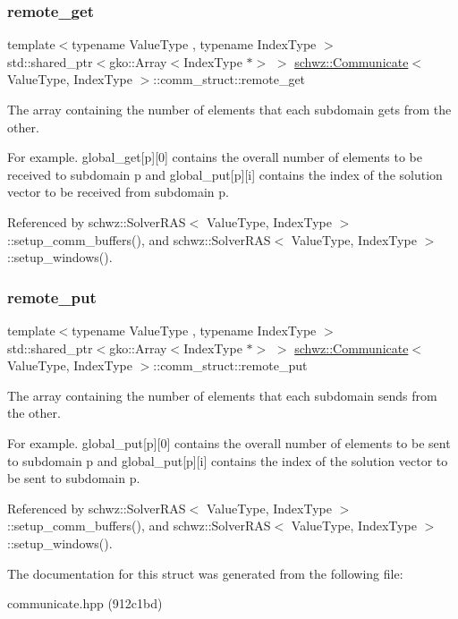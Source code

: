 \subsubsection{\texorpdfstring{remote\+\_\+get}{remote\_get}}
{\footnotesize\ttfamily template$<$typename Value\+Type , typename Index\+Type $>$ \\
std\+::shared\+\_\+ptr$<$gko\+::\+Array$<$Index\+Type $\ast$$>$ $>$ \hyperlink{classschwz_1_1Communicate}{schwz\+::\+Communicate}$<$ Value\+Type, Index\+Type $>$\+::comm\+\_\+struct\+::remote\+\_\+get}



The array containing the number of elements that each subdomain gets from the other. 

For example. global\+\_\+get\mbox{[}p\mbox{]}\mbox{[}0\mbox{]} contains the overall number of elements to be received to subdomain p and global\+\_\+put\mbox{[}p\mbox{]}\mbox{[}i\mbox{]} contains the index of the solution vector to be received from subdomain p. 

Referenced by schwz\+::\+Solver\+R\+A\+S$<$ Value\+Type, Index\+Type $>$\+::setup\+\_\+comm\+\_\+buffers(), and schwz\+::\+Solver\+R\+A\+S$<$ Value\+Type, Index\+Type $>$\+::setup\+\_\+windows().

\mbox{\label{structschwz_1_1Communicate_1_1comm__struct_a977cf8a2800021a50e59ee5cefb2a0ca}} 
\subsubsection{\texorpdfstring{remote\+\_\+put}{remote\_put}}
{\footnotesize\ttfamily template$<$typename Value\+Type , typename Index\+Type $>$ \\
std\+::shared\+\_\+ptr$<$gko\+::\+Array$<$Index\+Type $\ast$$>$ $>$ \hyperlink{classschwz_1_1Communicate}{schwz\+::\+Communicate}$<$ Value\+Type, Index\+Type $>$\+::comm\+\_\+struct\+::remote\+\_\+put}



The array containing the number of elements that each subdomain sends from the other. 

For example. global\+\_\+put\mbox{[}p\mbox{]}\mbox{[}0\mbox{]} contains the overall number of elements to be sent to subdomain p and global\+\_\+put\mbox{[}p\mbox{]}\mbox{[}i\mbox{]} contains the index of the solution vector to be sent to subdomain p. 

Referenced by schwz\+::\+Solver\+R\+A\+S$<$ Value\+Type, Index\+Type $>$\+::setup\+\_\+comm\+\_\+buffers(), and schwz\+::\+Solver\+R\+A\+S$<$ Value\+Type, Index\+Type $>$\+::setup\+\_\+windows().



The documentation for this struct was generated from the following file\+:\begin{DoxyCompactItemize}
\item 
communicate.\+hpp (912c1bd)\end{DoxyCompactItemize}
